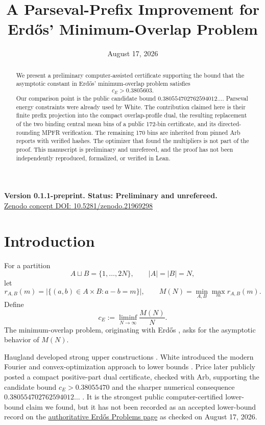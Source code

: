 \documentclass[11pt]{amsart}
\title{A Parseval-Prefix Improvement for Erd\H{o}s' Minimum-Overlap Problem}
\date{August 17, 2026}
\begin{document}
\begin{abstract}
We present a preliminary computer-assisted certificate supporting the bound
that the asymptotic constant in Erd\H{o}s' minimum-overlap problem satisfies
\[
  c_E>0.3805603.
\]
Our comparison point is the public candidate bound
$0.380554702762594012\ldots$.  Parseval energy constraints were already used
by White.  The contribution claimed here is their finite prefix projection
into the compact overlap-profile dual, the resulting replacement of the two
binding central mean bins of a public 172-bin certificate, and its
directed-rounding MPFR verification.  The remaining 170 bins are inherited
from pinned Arb reports with verified hashes.  The optimizer that found the
multipliers is not part of the proof.  This manuscript is preliminary and
unrefereed, and the proof has not been independently reproduced, formalized,
or verified in Lean.
\end{abstract}

\maketitle

\begin{center}
\textbf{Version 0.1.1-preprint. Status: Preliminary and unrefereed.}\\
\href{https://doi.org/10.5281/zenodo.21969298}%
{Zenodo concept DOI: 10.5281/zenodo.21969298}
\end{center}

\section{Introduction}

For a partition
\[
 A\sqcup B=\{1,\ldots,2N\},\qquad |A|=|B|=N,
\]
let
\[
 r_{A,B}(m)=|\{(a,b)\in A\times B:a-b=m\}|,
 \qquad
 M(N)=\min_{A,B}\max_m r_{A,B}(m).
\]
Define
\[
 c_E:=\liminf_{N\to\infty}\frac{M(N)}{N}.
\]
The minimum-overlap problem, originating with Erd\H{o}s
\cite{Erdos1955,Moser1959}, asks for the asymptotic behavior of $M(N)$.

Haugland developed strong upper constructions
\cite{Haugland1996,Haugland2016}.  White introduced the modern Fourier and
convex-optimization approach to lower bounds \cite{White2022}.  Price later
publicly posted a compact positive-part dual certificate, checked with Arb,
supporting the candidate bound $c_E>0.38055470$ and the sharper numerical
consequence $0.380554702762594012\ldots$ \cite{Price2026}.  It is the
strongest public computer-certified lower-bound claim we found, but it has not
been recorded as an accepted lower-bound record on the
\href{https://www.erdosproblems.com/36}{authoritative Erd\H{o}s Problems page}
as checked on August 17, 2026.
\end{document}
